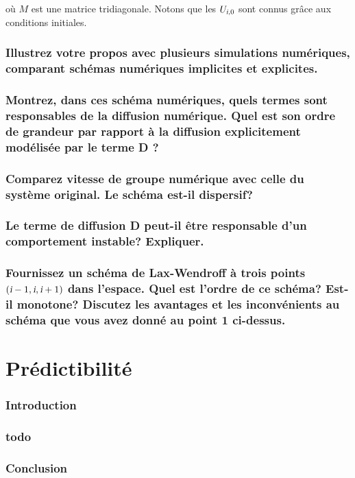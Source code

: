 \documentclass[a4paper, 12pt]{report}
\begin{document}
où $M$ est une matrice tridiagonale. Notons que les $U_{\textsl{i},0}$ sont connus
grâce aux conditions initiales.

\section{Illustrez votre propos avec plusieurs simulations numériques, comparant schémas numériques implicites et explicites.}

\section{Montrez, dans ces schéma numériques, quels termes sont responsables de la diffusion numérique. Quel est son ordre de grandeur par rapport à la diffusion explicitement modélisée par le terme D ?}


\section{Comparez vitesse de groupe numérique avec celle du système original. Le schéma est-il dispersif?}

\section{Le terme de diffusion D peut-il être responsable d'un comportement instable? Expliquer.}

\section{Fournissez un schéma de Lax-Wendroff à trois points $\left(\textsl{i}-1,\textsl{i},\textsl{i}+1\right)$ dans l'espace. Quel est l'ordre de ce schéma? Est-il monotone? Discutez les avantages et les inconvénients au schéma que vous avez donné au point 1 ci-dessus.}



\part{Prédictibilité}


\section*{Introduction}


\section{todo}


\section*{Conclusion}
\end{document}
